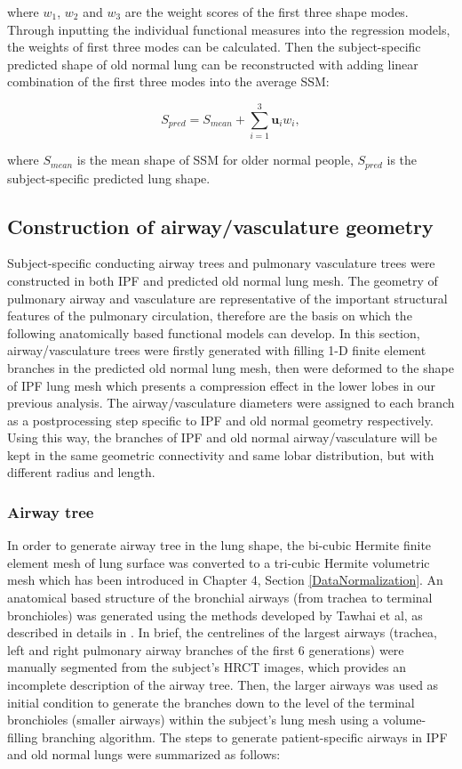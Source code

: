 \noindent where $w_1$, $w_2$ and $w_3$ are the weight scores of the first three shape modes. Through inputting the individual functional measures into the regression models, the weights of first three modes can be calculated. Then the subject-specific predicted shape of old normal lung can be reconstructed with adding linear combination of the first three modes into the average SSM:

\begin{equation}
 \label{eq:NormalLungPrediction}
 S_{pred} = S_{mean} + \sum_{i=1}^3 \mathbf{u}_i w_{i},
\end{equation}

\noindent where $S_{mean}$ is the mean shape of SSM for older normal people, $S_{pred}$ is the subject-specific predicted lung shape. 

\subsection{Construction of airway/vasculature geometry} \label{AirwayVesselGeometry}
Subject-specific conducting airway trees and pulmonary vasculature trees were constructed in both IPF and predicted old normal lung mesh. The  geometry of pulmonary airway and vasculature are representative of the important structural features of the pulmonary circulation, therefore are the basis on which the following anatomically based functional models can develop. In this section, airway/vasculature trees were firstly generated with filling 1-D finite element branches in the predicted old normal lung mesh, then were deformed to the shape of IPF lung mesh which presents a compression effect in the lower lobes in our previous analysis. The airway/vasculature diameters were assigned to each branch as a postprocessing step specific to IPF and old normal geometry respectively. Using this way, the branches of IPF and old normal airway/vasculature will be kept in the same geometric connectivity and same lobar distribution, but with different radius and length. 

\subsubsection{Airway tree}
In order to generate airway tree in the lung shape, the bi-cubic Hermite finite element mesh of lung surface was converted to a tri-cubic Hermite volumetric mesh which has been introduced in Chapter 4, Section \ref{DataNormalization}. An anatomical based structure of the bronchial airways (from trachea to terminal bronchioles) was generated using the methods developed by Tawhai et al, as described in details in \cite{tawhai2000generation, tawhai2004ct}. In brief, the centrelines of the largest airways (trachea, left and right pulmonary airway branches of the first 6 generations) were manually segmented from the subject's HRCT images, which provides an incomplete description of the airway tree. Then, the larger airways was used as initial condition to generate the branches down to the level of the terminal bronchioles (smaller airways) within the subject's lung mesh using a volume-filling branching algorithm. The steps to generate patient-specific airways in IPF and old normal lungs were summarized as follows:

